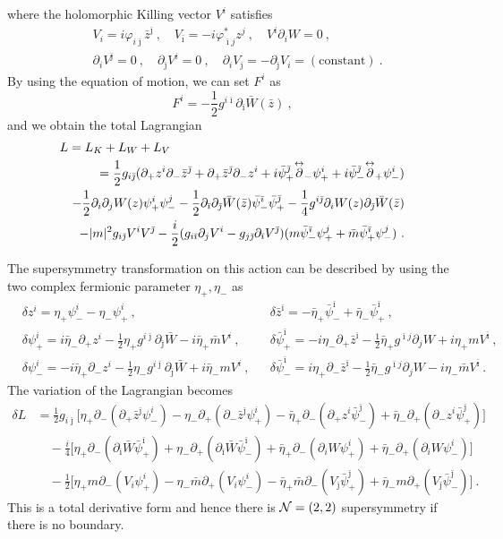 \documentclass[a4paper,12pt]{article}
\numberwithin{equation}{section}
\newcommand{\del}{\partial}
\newcommand{\ib}{\bar{\imath}}
\newcommand{\jb}{\bar{\jmath}}
\newcommand{\mb}{\bar{m}}
\newcommand{\zb}{\bar{z}}
\newcommand{\vp}{\varphi}
\newcommand{\nn}{\nonumber\\}
\newcommand{\Ncal}{{\cal N}}
\newcommand{\dlr}{\overset{\leftrightarrow}{\del}}
\newcommand{\psb}{\bar{\psi}}
\newcommand{\etb}{\bar{\eta}}
\newcommand{\Wb}{\bar{W}}
\newcommand{\pha}{z}
\newcommand{\phb}{\bar{z}}
\begin{document}
where the holomorphic Killing vector $V^{i}$ satisfies
\begin{align}
 &V_{i}=i\vp_{i\jb}\zb^{\jb}~,\quad V_{\ib}=-i\vp^*_{\ib j}z^{j}~,
     \quad V^{i}\del_{i}W =0~,\nn
 &\del_{i}V^{\jb}=0~, \quad \del_{\jb}V^{i}=0~,\quad 
 \del_{i}V_{\jb}=-\del_{\jb}V_{i}=(\text{constant})~.
\end{align}
By using the equation of motion, we can set $F^i$ as 
\begin{equation}
 F^i=-\frac12g^{i\ib}\del_{\ib}\Wb(\phb)~,
\end{equation}
and we obtain the total Lagrangian
\begin{eqnarray}
\lefteqn{L=L_K+L_W+L_V}\nn
&&=\frac12 g_{i\jb}
   (\del_+ \pha^{i}\del_- \phb^{\jb} + \del_+ \phb^{\jb}\del_- \pha^{i} 
  +i\psb_{+}^{\jb} \dlr_{-}\psi_{+}^{i}
  +i\psb_{-}^{\jb} \dlr_{+}\psi_{-}^{i})\nn
&& -\frac12\del_{i}\del_{j}W(\pha)\psi_{+}^{i}\psi_{-}^{j}
        -\frac12\del_{\ib}\del_{\jb}\Wb(\phb)\psb_{-}^{\ib}\psb_{+}^{\jb}
        -\frac14g^{i\jb}\del_{i} W(\pha)\del_{\jb}\Wb(\phb)\nn
&&-|m|^2 g_{i\jb}V^{i}V^{\jb}
 -\frac{i}{2}(g_{i\ib}\del_{j}V^{i}-g_{j\jb}\del_{\ib}V^{\jb})
  (m\psb_{-}^{\ib}\psi_{+}^{j}+\mb\psb_{+}^{\ib}\psi_{-}^{j}) ~.
\end{eqnarray}

The supersymmetry transformation on this action 
can be described by using
the two complex fermionic parameter $\eta_{+}, \eta_{-}$ as
\begin{align}
 &\delta z^{i}=\eta_{+}\psi_{-}^{i}-\eta_{-}\psi_{+}^{i}~,
 &&\delta \zb^{\ib}=-\etb_{+}\psb_{-}^{\ib}+\etb_{-}\psb_{+}^{\ib}~,\nn
 &\delta \psi_{+}^{i}=i\etb_{-}\del_{+}z^{i}
                 -\frac12 \eta_{+}g^{i\jb}\del_{\jb}\Wb
         -i\etb_{+}\mb V^{i}~,
 &&\delta \psb_{+}^{\ib}=-i\eta_{-}\del_{+}\zb^{\ib}
                 -\frac12 \etb_{+}g^{\ib j}\del_{j}W
         +i\eta_{+}m V^{\ib}~,
\nn
 &\delta \psi_{-}^{i}=-i\etb_{+}\del_{-}z^{i}
                 -\frac12 \eta_{-}g^{i\jb}\del_{\jb}\Wb
         +i\etb_{-} m V^{i}~,
 &&\delta \psb_{-}^{\ib}=i\eta_{+}\del_{-}\zb^{\ib}
                 -\frac12 \etb_{-}g^{\ib j}\del_{j}W
         -i\eta_{-} \mb V^{\ib}~.
\end{align}
The variation of the Lagrangian becomes
\begin{align}
 \delta L&=\frac12 g_{i\jb}\Big[
  \eta_{+}\del_{-}(\del_{+}\phb^{\jb}\psi^{i}_{-})
  -\eta_{-}\del_{+}(\del_{-}\phb^{\jb}\psi^{i}_{+})
  -\etb_{+}\del_{-}(\del_{+}\pha^{i}\psb^{\jb}_{-})
  +\etb_{-}\del_{+}(\del_{-}\pha^{i}\psb^{\jb}_{+})
  \Big]\nn
 &\quad -\frac{i}{4}\Big[
      \eta_{+}\del_{-}(\del_{\ib}\Wb\psb^{\ib}_{+})
     +\eta_{-}\del_{+}(\del_{\ib}\Wb\psb^{\ib}_{-})
     +\etb_{+}\del_{-}(\del_{ i } W \psi^{ i }_{+})
     +\etb_{-}\del_{+}(\del_{ i } W \psi^{ i }_{-})
    \Big]\nn
 &\quad -\frac12\Big[
  \eta_{+} m \del_{-}(V_{ i }\psi^{ i }_{+})
 -\eta_{-}\mb\del_{+}(V_{ i }\psi^{ i }_{-})
 -\etb_{+}\mb\del_{-}(V_{\jb}\psb^{\jb}_{+})
 +\etb_{-} m \del_{+}(V_{\jb}\psb^{\jb}_{-})
   \Big] ~.
\label{22variation}
\end{align}
This is a total derivative form 
and hence there is $\Ncal=(2,2)$ supersymmetry if there is no boundary.
\end{document}
